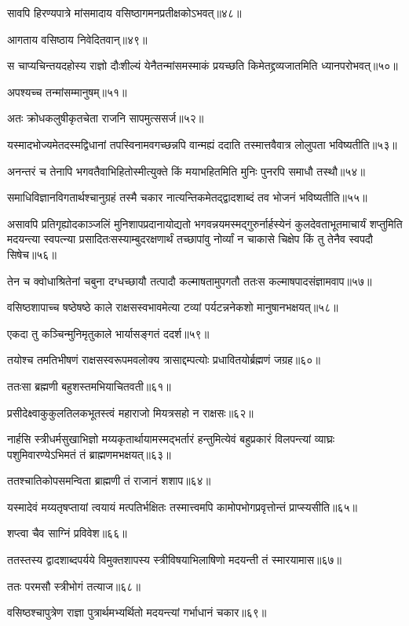 \begin{flushleft}
सावपि हिरण्यपात्रे मांसमादाय वसिष्ठागमनप्रतीक्षकोऽभवत्॥४८॥

आगताय वसिष्ठाय निवेदितवान्॥४९॥

स चाप्यचिन्तयदहोस्य राज्ञो दौःशील्यं येनैतन्मांसमस्माकं प्रयच्छति किमेतद्द्रव्यजातमिति ध्यानपरोभवत्॥५०॥

अपश्यच्च तन्मांसम्मानुषम्॥५१॥

अतः क्रोधकलुषीकृतचेता राजनि सापमुत्ससर्ज॥५२॥

यस्मादभोज्यमेतदस्मद्विधानां तपस्विनामवगच्छन्नपि वान्मह्यं ददाति तस्मात्तवैवात्र लोलुपता भविष्यतीति॥५३॥

अनन्तरं च तेनापि भगवतैवाभिहितोस्मीत्युक्ते किं मयाभहितमिति मुनिः पुनरपि समाधौ तस्थौ॥५४॥

समाधिविज्ञानविगतार्थश्चानुग्रहं तस्मै चकार नात्यन्तिकमेतद्द्वादशाब्दं तव भोजनं भविष्यतीति॥५५॥

असावपि प्रतिगृह्योदकाञ्जलिं मुनिशापप्रदानायोद्यतो भगवन्नयमस्मद्गुरुर्नार्हस्येनं कुलदेवताभूतमाचार्यं शप्तुमिति मदयन्त्या स्वपत्न्या प्रसादितःसस्याम्बुदरक्षणार्थं तच्छापांवु नोर्व्यां न चाकासे चिक्षेप किं तु तेनैव स्वपदौ सिषेच॥५६॥

तेन च क्वोधाश्रितेनां चबुना दग्धच्छायौ तत्पादौ कल्माषतामुपगतौ ततःस कल्माषपादसंज्ञामवाप॥५७॥

वसिष्ठशापाच्च षष्ठेषष्ठे काले राक्षसस्वभावमेत्या टव्यां पर्यटन्ननेकशो मानुषानभक्षयत्॥५८॥

एकदा तु कञ्चिन्मुनिमृतुकाले भार्यासङ्गतं ददर्श॥५९॥

तयोश्च तमतिभीषणं राक्षसस्वरूपमवलोक्य त्रासाद्दम्पत्योः प्रधावितयोर्ब्रह्मणं जग्रह॥६०॥

ततःसा ब्रह्मणी बहुशस्तमभियाचितवती॥६१॥

प्रसीदेक्ष्वाकुकुलतिलकभूतस्त्वं महाराजो मियत्रसहो न राक्षसः॥६२॥

नार्हसि स्त्रीधर्मसुखाभिज्ञो मय्यकृतार्थायामस्मद्भर्तारं हन्तुमित्येवं बहुप्रकारं विलपन्त्यां व्याघ्रः पशुमिवारण्येऽभिमतं तं ब्राह्मणमभक्षयत्॥६३॥

ततश्चातिकोपसमन्विता ब्राह्मणी तं राजानं शशाप॥६४॥

यस्मादेवं मय्यतृषप्तायां त्वयायं मत्पतिर्भक्षितः तस्मात्त्वमपि कामोपभोगप्रवृत्तोन्तं प्राप्स्यसीति॥६५॥

शप्त्वा चैव साग्निं प्रविवेश॥६६॥

ततस्तस्य द्वादशाब्दपर्यये विमुक्तशापस्य स्त्रीविषयाभिलाषिणो मदयन्ती तं स्मारयामास॥६७॥

ततः परमसौ स्त्रीभोगं तत्याज॥६८॥

वसिष्ठश्चापुत्रेण राज्ञा पुत्रार्थमभ्यर्थितो मदयन्त्यां गर्भाधानं चकार॥६९॥


\end{flushleft}
